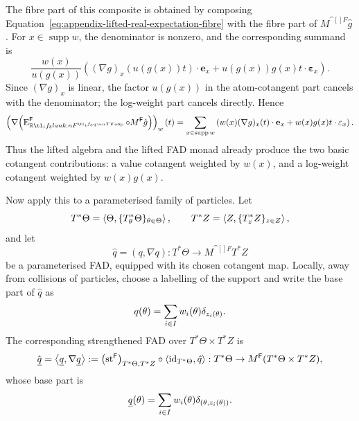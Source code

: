 \documentclass[11pt,a4paper]{article}
\theoremstyle{definition}
\theoremstyle{remark}
\providecommand{\id}{\mathrm{id}}
\providecommand{\supp}{\operatorname{supp}}
\providecommand{\str}{\operatorname{st}}
\providecommand{\vect}[1]{\mathbf{#1}}
\begin{document}
The fibre part of this composite is obtained by composing
Equation~\eqref{eq:appendix-lifted-real-expectation-fibre} with the fibre part of
\(M^{\cat[]{F}}\hat g\).
For \(x\in\supp w\), the denominator is nonzero, and the
corresponding summand is
\[
  \frac{w(x)}{u(g(x))}
  \left(
    (\nabla g)_x
    \left(
      u(g(x))t
    \right)
    \cdot\vect{e}_{x}
    +
    u(g(x))g(x)t\cdot\vect{\varepsilon}_{x}
  \right).
\]
Since \((\nabla g)_x\) is linear, the factor \(u(g(x))\) in the
atom-cotangent part cancels with the denominator; the log-weight part
cancels directly.  Hence
\begin{equation}
  \label{eq:appendix-frobenius-cotangent-rule}
  \left(
    \nabla\!\left(
      \opn{E}^{\cat[]{F}}_{\R}
      \circ
      M^{\cat[]{F}}\hat g
    \right)
  \right)_w(t)
  =
  \sum_{x\in\supp w}
  \left(
    w(x)(\nabla g)_x(t)\cdot\vect{e}_{x}
    +
    w(x)g(x)t\cdot\vect{\varepsilon}_{x}
  \right).
\end{equation}
Thus the lifted algebra and the lifted FAD monad already produce the two
basic cotangent contributions: a value cotangent weighted by \(w(x)\),
and a log-weight cotangent weighted by \(w(x)g(x)\).

Now apply this to a parameterised family of particles.  Let
\[
  T^*\Theta=\left\langle \Theta,\{T^*_\theta\Theta\}_{\theta\in\Theta}\right\rangle,
  \qquad
  T^*Z=\left\langle Z,\{T^*_zZ\}_{z\in Z}\right\rangle,
\]
and let
\[
  \hat q=(q,\nabla q):T^*\Theta\to M^{\cat[]{F}}T^*Z
\]
be a parameterised FAD, equipped with its chosen cotangent map.  Locally,
away from collisions of particles, choose a labelling of the support and
write the base part of \(\hat q\) as
\[
  \fn[n]{ q}{\theta}
  =
  \sum_{i\in I}w_i(\theta)\delta_{z_i(\theta)}.
\]
The corresponding strengthened FAD over
\(T^*\Theta\times T^*Z\) is
\[
  \hat{\underline q}=\tuple{\underline q,\nabla\underline q}
  :=
  \Nat[nn]{\str^{\cat[]{F}}}{T^*\Theta,T^*Z}
  \circ
  \tupling{\id_{T^*\Theta},\hat q}
  :
  T^*\Theta
  \to
  M^{\cat[]{F}}(T^*\Theta\times T^*Z),
\]
whose base part is
\[
  \fn[n]{\underline q}{\theta}
  =
  \sum_{i\in I}w_i(\theta)\delta_{(\theta,z_i(\theta))}.
\]
\end{document}
